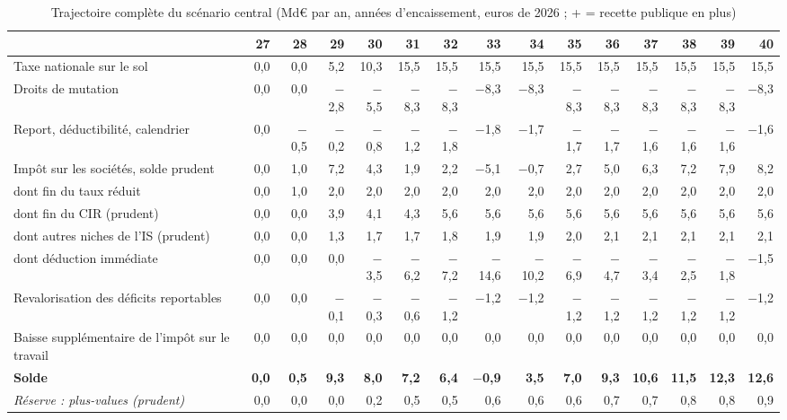 \begin{table}[!htbp]\centering\scriptsize\setlength{\tabcolsep}{2.1pt}
\caption{Trajectoire complète du scénario central (Md€ par an, années d'encaissement, euros de 2026 ; + = recette publique en plus)}
\begin{tabular}{@{}lrrrrrrrrrrrrrr@{}}\toprule
 & 27 & 28 & 29 & 30 & 31 & 32 & 33 & 34 & 35 & 36 & 37 & 38 & 39 & 40 \\ \midrule
Taxe nationale sur le sol & 0{,}0 & 0{,}0 & 5{,}2 & 10{,}3 & 15{,}5 & 15{,}5 & 15{,}5 & 15{,}5 & 15{,}5 & 15{,}5 & 15{,}5 & 15{,}5 & 15{,}5 & 15{,}5 \\
Droits de mutation & 0{,}0 & 0{,}0 & $-$2{,}8 & $-$5{,}5 & $-$8{,}3 & $-$8{,}3 & $-$8{,}3 & $-$8{,}3 & $-$8{,}3 & $-$8{,}3 & $-$8{,}3 & $-$8{,}3 & $-$8{,}3 & $-$8{,}3 \\
Report, déductibilité, calendrier & 0{,}0 & $-$0{,}5 & $-$0{,}2 & $-$0{,}8 & $-$1{,}2 & $-$1{,}8 & $-$1{,}8 & $-$1{,}7 & $-$1{,}7 & $-$1{,}7 & $-$1{,}6 & $-$1{,}6 & $-$1{,}6 & $-$1{,}6 \\
Impôt sur les sociétés, solde prudent & 0{,}0 & 1{,}0 & 7{,}2 & 4{,}3 & 1{,}9 & 2{,}2 & $-$5{,}1 & $-$0{,}7 & 2{,}7 & 5{,}0 & 6{,}3 & 7{,}2 & 7{,}9 & 8{,}2 \\
\quad dont fin du taux réduit & 0{,}0 & 1{,}0 & 2{,}0 & 2{,}0 & 2{,}0 & 2{,}0 & 2{,}0 & 2{,}0 & 2{,}0 & 2{,}0 & 2{,}0 & 2{,}0 & 2{,}0 & 2{,}0 \\
\quad dont fin du CIR (prudent) & 0{,}0 & 0{,}0 & 3{,}9 & 4{,}1 & 4{,}3 & 5{,}6 & 5{,}6 & 5{,}6 & 5{,}6 & 5{,}6 & 5{,}6 & 5{,}6 & 5{,}6 & 5{,}6 \\
\quad dont autres niches de l'IS (prudent) & 0{,}0 & 0{,}0 & 1{,}3 & 1{,}7 & 1{,}7 & 1{,}8 & 1{,}9 & 1{,}9 & 2{,}0 & 2{,}1 & 2{,}1 & 2{,}1 & 2{,}1 & 2{,}1 \\
\quad dont déduction immédiate & 0{,}0 & 0{,}0 & 0{,}0 & $-$3{,}5 & $-$6{,}2 & $-$7{,}2 & $-$14{,}6 & $-$10{,}2 & $-$6{,}9 & $-$4{,}7 & $-$3{,}4 & $-$2{,}5 & $-$1{,}8 & $-$1{,}5 \\
Revalorisation des déficits reportables & 0{,}0 & 0{,}0 & $-$0{,}1 & $-$0{,}3 & $-$0{,}6 & $-$1{,}2 & $-$1{,}2 & $-$1{,}2 & $-$1{,}2 & $-$1{,}2 & $-$1{,}2 & $-$1{,}2 & $-$1{,}2 & $-$1{,}2 \\
Baisse supplémentaire de l'impôt sur le travail & 0{,}0 & 0{,}0 & 0{,}0 & 0{,}0 & 0{,}0 & 0{,}0 & 0{,}0 & 0{,}0 & 0{,}0 & 0{,}0 & 0{,}0 & 0{,}0 & 0{,}0 & 0{,}0 \\
\textbf{Solde} & \textbf{0{,}0} & \textbf{0{,}5} & \textbf{9{,}3} & \textbf{8{,}0} & \textbf{7{,}2} & \textbf{6{,}4} & \textbf{$-$0{,}9} & \textbf{3{,}5} & \textbf{7{,}0} & \textbf{9{,}3} & \textbf{10{,}6} & \textbf{11{,}5} & \textbf{12{,}3} & \textbf{12{,}6} \\
\emph{Réserve : plus-values (prudent)} & 0{,}0 & 0{,}0 & 0{,}0 & 0{,}2 & 0{,}5 & 0{,}5 & 0{,}6 & 0{,}6 & 0{,}6 & 0{,}7 & 0{,}7 & 0{,}8 & 0{,}8 & 0{,}9 \\
\bottomrule\end{tabular}
\end{table}
